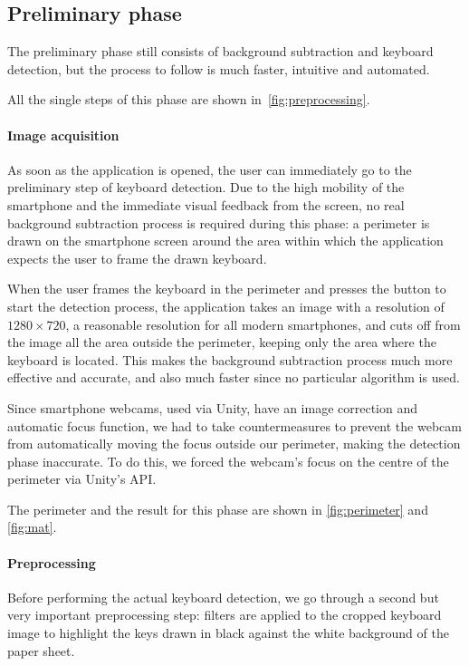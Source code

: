 \subsection{Preliminary phase}\label{subsec:preliminary-phase}
The preliminary phase still consists of background subtraction and keyboard detection, but the process to follow is much
faster, intuitive and automated.

All the single steps of this phase are shown in~\autoref{fig:preprocessing}.

\paragraph{Image acquisition}
As soon as the application is opened, the user can immediately go to the preliminary step of keyboard detection.
Due to the high mobility of the smartphone and the immediate visual feedback from the screen,
no real background subtraction process is required during this phase: a perimeter is drawn on the smartphone screen
around the area within which the application expects the user to frame the drawn keyboard.

When the user frames the keyboard in the perimeter and presses the button to start the detection process,
the application takes an image with a resolution of $1280 \times 720$, a reasonable resolution for all modern smartphones,
and cuts off from the image all the area outside the perimeter, keeping only the area where the keyboard is located.
This makes the background subtraction process much more effective and accurate,
and also much faster since no particular algorithm is used.

Since smartphone webcams, used via Unity, have an image correction and automatic focus function,
we had to take countermeasures to prevent the webcam from automatically
moving the focus outside our perimeter, making the detection phase inaccurate.
To do this, we forced the webcam's focus on the centre of the perimeter via Unity's API\@.

The perimeter and the result for this phase are shown in \autoref{fig:perimeter} and \autoref{fig:mat}.

\paragraph{Preprocessing}
Before performing the actual keyboard detection, we go through a second but very important preprocessing step:
filters are applied to the cropped keyboard image to highlight the 
keys drawn in black against the white background of the paper sheet.

